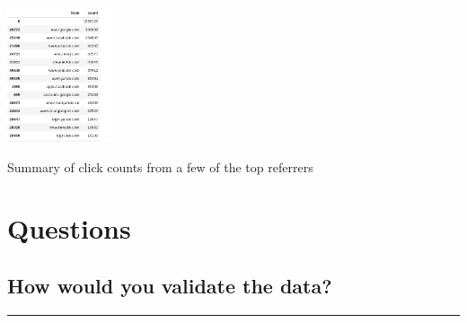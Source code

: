 \documentclass[11pt]{article}
\begin{document}
\begin{itemize}
\begin{center}
\includegraphics[height=150]{imgs/ads-referrer.png}
\end{center}

\begin{center}
Summary of click counts from a few of the top referrers
\end{center}
\end{itemize}


\section{Questions}
\label{sec:org1966948}

\subsection{How would you validate the data?}
\label{sec:org4c1dc23}
\noindent\rule{\textwidth}{0.5pt}
\end{document}
